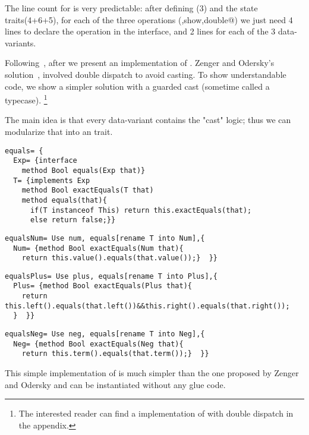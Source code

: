 The line count for \name is very predictable: after defining \Q@exp@ (3) and the state traits(4+6+5),
for each of the three operations (\Q@eval,show,double@) 
we just need 4 lines to declare the operation 
in the interface, and 2 lines for each of the 3 data-variants.

Following~\cite{Zenger-Odersky2005}, after \Q@double@ we present an implementation of \Q@equals@.
Zenger and Odersky's solution~\cite{Zenger-Odersky2005}, involved double dispatch to avoid casting.
To show understandable code, we show a simpler solution 
with a guarded cast (sometime called a typecase).%
\footnote{
The interested reader can find a \name implementation of \Q@equals@ with double dispatch
in the appendix.
}

The main idea is that  every data-variant  contains
 the "cast" logic; thus
 we can modularize that into an \Q@equals@ trait.
\begin{lstlisting}
equals= {
  Exp= {interface
    method Bool equals(Exp that)}
  T= {implements Exp
    method Bool exactEquals(T that)
    method equals(that){
      if(T instanceof This) return this.exactEquals(that);
      else return false;}}
\end{lstlisting}
\multiCode
\begin{lstlisting}
equalsNum= Use num, equals[rename T into Num],{
  Num= {method Bool exactEquals(Num that){
    return this.value().equals(that.value());}  }}
\end{lstlisting}
\multiCode
\begin{lstlisting}
equalsPlus= Use plus, equals[rename T into Plus],{
  Plus= {method Bool exactEquals(Plus that){
    return this.left().equals(that.left())&&this.right().equals(that.right());
  }  }}
\end{lstlisting}
\multiCode
\begin{lstlisting}
equalsNeg= Use neg, equals[rename T into Neg],{
  Neg= {method Bool exactEquals(Neg that){
    return this.term().equals(that.term());}  }}
\end{lstlisting}

This simple implementation of \Q@equals@
is much simpler than the one proposed by Zenger and Odersky
 and can be instantiated without any glue code.


